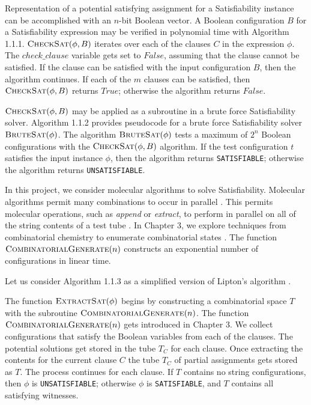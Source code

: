 Representation of a potential satisfying assignment for a {\sc Satisfiability} instance can be accomplished with an $n$-bit Boolean vector.  A Boolean configuration $B$ for a {\sc Satisfiability} expression may be verified in polynomial time with Algorithm 1.1.1.  $\text{\sc CheckSat}(\phi, B)$ iterates over each of the clauses $C$ in the expression $\phi$.  The $check\_clause$ variable gets set to $False$, assuming that the clause cannot be satisfied.  If the clause can be satisfied with the input configuration $B$, then the algorithm continues.  If each of the $m$ clauses can be satisfied, then $\text{\sc CheckSat}(\phi, B)$ returns $True$; otherwise the algorithm returns $False$.




$\text{\sc CheckSat}(\phi, B)$ may be applied as a subroutine in a brute force {\sc Satisfiability} solver.  Algorithm 1.1.2 provides pseudocode for a brute force {\sc Satisfiability} solver $\text{\sc BruteSat}(\phi)$.  The algorithm $\text{\sc BruteSat}(\phi)$ tests a maximum of $2^n$ Boolean configurations with the $\text{\sc CheckSat}(\phi, B)$ algorithm.  If the test configuration $t$ satisfies the input instance $\phi$, then the algorithm returns \texttt{SATISFIABLE}; otherwise the algorithm returns \texttt{UNSATISFIABLE}.

In this project, we consider molecular algorithms to solve {\sc Satisfiability}.  Molecular algorithms permit many combinations to occur in parallel \cite{Adleman:1994:MCS:189441.189442, Lipton95usingdna}.  This permits molecular operations, such as \textit{append} or \textit{extract}, to perform in parallel on all of the string contents of a test tube \cite{Adleman:1994:MCS:189441.189442, Lipton95usingdna, dnaComputingModels2008}.  In Chapter 3, we explore techniques from combinatorial chemistry to enumerate combinatorial states \cite{Lipton95usingdna, furkaBook, dnaComputingModels2008}.  The function $\text{\sc CombinatorialGenerate}(n)$ constructs an exponential number of configurations in linear time.

Let us consider Algorithm 1.1.3 as a simplified version of Lipton's algorithm \cite{Lipton95usingdna, dnaComputingModels2008}.  



The function $\text{\sc ExtractSat}(\phi)$ begins by constructing a combinatorial space $T$ with the subroutine $\text{\sc CombinatorialGenerate}(n)$.  The function $\text{\sc CombinatorialGenerate}(n)$ gets introduced in Chapter 3.  We collect configurations that satisfy the Boolean variables from each of the clauses.  The potential solutions get stored in the tube $T_C$ for each clause.  Once extracting the contents for the current clause $C$ the tube $T_C$ of partial assignments gets stored as $T$.  The process continues for each clause.  If $T$ contains no string configurations, then $\phi$ is \texttt{UNSATISFIABLE}; otherwise $\phi$ is \texttt{SATISFIABLE}, and $T$ contains all satisfying witnesses.

